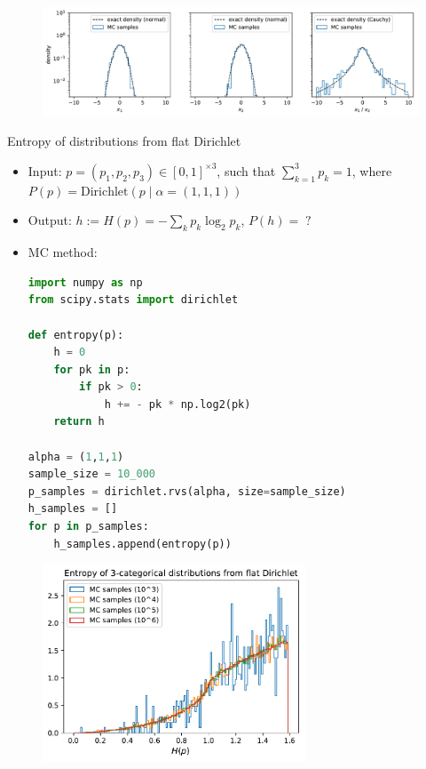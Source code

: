 \begin{figure}[h]
\centering
	\includegraphics[width=\textwidth]{./figs/07-Cauchy.pdf}
\end{figure}

\newpage
{} Entropy of distributions from flat Dirichlet
\begin{itemize}
	\item Input: $p = (p_1, p_2, p_3) \in [0,1]^{\times 3}$, such that $\sum_{k=1}^3 p_k = 1$, where $P(p) = \text{Dirichlet}(p\;|\;\alpha = (1,1,1))$
	\item Output: $h := H(p) = -\sum_k p_k \log_2 p_k$,\; $P(h) = \;?$
	\item MC method:
\begin{lstlisting}[language=python]
import numpy as np
from scipy.stats import dirichlet

def entropy(p):
    h = 0
    for pk in p:
        if pk > 0:
            h += - pk * np.log2(pk)
    return h

alpha = (1,1,1)
sample_size = 10_000
p_samples = dirichlet.rvs(alpha, size=sample_size)
h_samples = []    
for p in p_samples:
    h_samples.append(entropy(p))
\end{lstlisting}
\end{itemize}
\begin{figure}[h]
\centering
	\includegraphics[width=0.7\textwidth]{./figs/07-entropy.pdf}
\end{figure}

